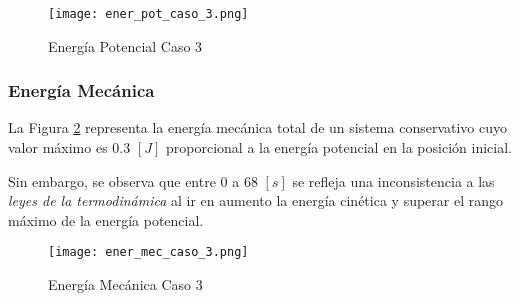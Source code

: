     \begin{figure} [H]%
            \centering
            \texttt{[image: ener\_pot\_caso\_3.png]} 
        \caption{Energía Potencial Caso 3}
        \label{fig:ePotC3}
    \end{figure}

    \subsubsection{Energía Mecánica}
    \noindent La Figura \ref{fig:eMecC3} representa la energía mecánica total de 
    un sistema conservativo cuyo valor máximo es $0.3$ $[J]$ proporcional a
    la energía potencial en la posición inicial. 

    Sin embargo, se observa que entre $0$ a $68$ $[s]$ se refleja una inconsistencia
    a las \emph{leyes de la termodinámica} al ir en aumento la energía cinética y 
    superar el rango máximo de la energía potencial.

    \begin{figure}[H]%
            \centering
            \texttt{[image: ener\_mec\_caso\_3.png]} 
        \caption{Energía Mecánica Caso 3}
        \label{fig:eMecC3}
    \end{figure}